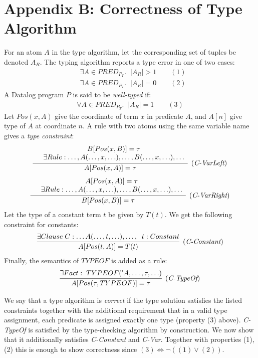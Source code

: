 \section{Appendix B: Correctness of Type Algorithm}
For an atom $A$ in the type algorithm, let the corresponding set of tuples be denoted $A_R$. The typing algorithm reports a type error in one of two cases:
\begin{align*}
&\exists A \in PRED_{P_T}.\;\;|A_R| > 1 \quad\quad (1)\\
&\exists A \in PRED_{P_T}.\;\;|A_R| = 0 \quad\quad (2)
\end{align*}
\noindent
A Datalog program $P$ is said to be \textit{well-typed} if:
\begin{align*}
\forall A \in PRED_{P_T}. \;\; |A_R| = 1 \quad\quad (3)
\end{align*}
\noindent
Let $Pos(x, A)$ give the coordinate of term $x$ in predicate $A$, and $A[n]$ give type of $A$ at coordinate $n$. A rule with two atoms using the same variable name gives a \textit{type constraint}:
\begin{align*}
\infer[(\textit{C-VarLeft})]{A[Pos(x, A)] = \tau}{\begin{array}{c c} &B[Pos(x, B)] = \tau\\&\exists Rule: \ldots, A( \ldots, x, \ldots), \ldots, B(\ldots, x, \ldots), \ldots\end{array}}
\end{align*}
\begin{align*}
\infer[(\textit{C-VarRight})]{B[Pos(x, B)] = \tau}{\begin{array}{c c} &A[Pos(x, A)] = \tau\\&\exists Rule: \ldots, A( \ldots, x, \ldots), \ldots, B(\ldots, x, \ldots), \ldots\end{array}}
\end{align*}
\noindent
Let the type of a constant term $t$ be given by $T(t)$. We get the following constraint for constants:
\begin{align*}
\infer[(\textit{C-Constant})]{A[Pos(t, A)] = T(t)}{\exists Clause\;C: \ldots A(\ldots, t, \ldots), \ldots, \;\; t : Constant } 
\end{align*}
\noindent
Finally, the semantics of $TYPEOF$ is added as a rule:
\begin{align*}
\infer[(\textit{C-TypeOf})]{A[Pos(\tau, TYPEOF)] = \tau}{\exists Fact: \; TYPEOF('A,\ldots, \tau, \ldots) } 
\end{align*}

\noindent
We say that a type algorithm is \textit{correct} if the type solution satisfies the listed constraints together with the additional requirement that in a valid type assignment, each predicate is assigned exactly one type (property (3) above). \textit{C-TypeOf} is satisfied by the type-checking algorithm by construction. We now show that it additionally satisfies \textit{C-Constant} and \textit{C-Var}. Together with properties (1), (2) this is enough to show correctness since $(3) \iff \neg ((1) \lor (2))$.

